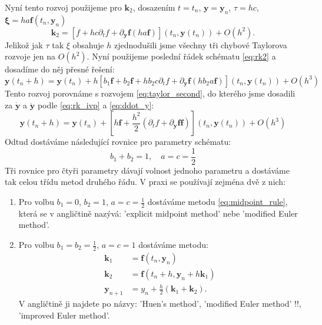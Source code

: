 \documentclass[a4paper, 12pt]{book}
\theoremstyle{definition}
\def\vc#1{\mathbf{\boldsymbol{#1}}}     %
\def\prtl{\partial}                                        %
\begin{document}
Nyní tento rozvoj použijeme pro $\vc k_2$, dosazením $t= t_n$, $\vc y = \vc y_n$, $\tau = hc$, $\vc \xi = ha \vc f(t_n, \vc y_n)$
\[
    \vc k_2 = [f + hc\prtl_t f + \prtl_{\vc y} \vc f (ha\vc f)](t_n, \vc y(t_n)) + O(h^2).
\]
Jelikož jak $\tau$ tak $\xi$ obsahuje $h$ zjednodušili jsme všechny tři chybové Taylorova rozvoje jen na $O(h^2)$.
Nyní použijeme poslední řádek schématu \eqref{eq:rk2} a dosadíme do něj přesné řešení:
\[
  \vc y(t_n + h) = \vc y(t_n) + h\left[ b_1 \vc f + b_2 \vc f + hb_2c\prtl_t f + \prtl_{\vc y} \vc f (hb_2a\vc f) \right](t_n, \vc y(t_n)) + O(h^3)
\]
Tento rozvoj porovnáme s rozvojem \eqref{eq:taylor_second}, do kterého jsme dosadili za $\dot{\vc y}$ a $\ddot{ \vc y}$ podle 
\eqref{eq:rk_ivp} a \eqref{eq:ddot_y}:
\[
  \vc y(t_n + h) = \vc y(t_n) + \left[h\vc f + \frac{h^2}{2}(\prtl_t f + \prtl_{\vc y} \vc f \vc f)\right](t_n, \vc y(t_n)) + O(h^3) 
\]
Odtud dostáváme následující rovnice pro parametry schématu:
\[
   b_1 + b_2 = 1,\quad a = c = \frac12
\]
Tři rovnice pro čtyři parametry dávají volnost jednoho parametru a dostáváme tak celou třídu metod druhého řádu. V praxi se používají zejména dvě
z nich:
\begin{enumerate}
 \item Pro volbu $b_1 =0$, $b_2 =1$, $a=c=\frac12$ dostáváme metodu \eqref{eq:midpoint_rule}, 
 která se v angličtině nazývá: 'explicit midpoint method' nebe 'modified Euler method'.
 \item Pro volbu $b_1 = b_2 = \frac12$, $a=c=1$ dostáváme metodu:
 \begin{align}
    \label{eq:trapezoid_rule}
    \vc k_1 &= \vc f(t_n, \vc y_n)\\
    \vc k_2 &= \vc f(t_n + h, \vc y_n + h \vc k_1)\\
    {\vc y}_{n+1} &= y_n + \frac{h}{2}(\vc k_1 + \vc k_2).
 \end{align}
 V angličtině ji najdete po názvy: 'Huen's method', 'modified Euler method' !!, 'improved Euler method'. 
\end{enumerate}
\end{document}
